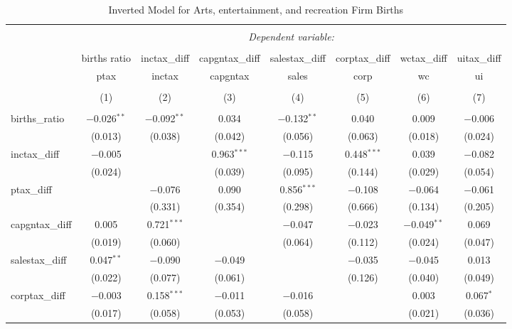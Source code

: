 
\begin{table}[!htbp] \centering 
  \caption{Inverted Model for  Arts, entertainment, and recreation Firm Births} 
  \label{71rd} 
\footnotesize 
\begin{tabular}{@{\extracolsep{5pt}}lccccccc} 
\\[-1.8ex]\hline 
\hline \\[-1.8ex] 
 & \multicolumn{7}{c}{\textit{Dependent variable:}} \\ 
\cline{2-8} 
\\[-1.8ex] & births ratio & inctax\_diff & capgntax\_diff & salestax\_diff & corptax\_diff & wctax\_diff & uitax\_diff \\ 
 & ptax & inctax & capgntax & sales & corp & wc & ui \\ 
\\[-1.8ex] & (1) & (2) & (3) & (4) & (5) & (6) & (7)\\ 
\hline \\[-1.8ex] 
 births\_ratio & $-$0.026$^{**}$ & $-$0.092$^{**}$ & 0.034 & $-$0.132$^{**}$ & 0.040 & 0.009 & $-$0.006 \\ 
  & (0.013) & (0.038) & (0.042) & (0.056) & (0.063) & (0.018) & (0.024) \\ 
  inctax\_diff & $-$0.005 &  & 0.963$^{***}$ & $-$0.115 & 0.448$^{***}$ & 0.039 & $-$0.082 \\ 
  & (0.024) &  & (0.039) & (0.095) & (0.144) & (0.029) & (0.054) \\ 
  ptax\_diff &  & $-$0.076 & 0.090 & 0.856$^{***}$ & $-$0.108 & $-$0.064 & $-$0.061 \\ 
  &  & (0.331) & (0.354) & (0.298) & (0.666) & (0.134) & (0.205) \\ 
  capgntax\_diff & 0.005 & 0.721$^{***}$ &  & $-$0.047 & $-$0.023 & $-$0.049$^{**}$ & 0.069 \\ 
  & (0.019) & (0.060) &  & (0.064) & (0.112) & (0.024) & (0.047) \\ 
  salestax\_diff & 0.047$^{**}$ & $-$0.090 & $-$0.049 &  & $-$0.035 & $-$0.045 & 0.013 \\ 
  & (0.022) & (0.077) & (0.061) &  & (0.126) & (0.040) & (0.049) \\ 
  corptax\_diff & $-$0.003 & 0.158$^{***}$ & $-$0.011 & $-$0.016 &  & 0.003 & 0.067$^{*}$ \\ 
  & (0.017) & (0.058) & (0.053) & (0.058) &  & (0.021) & (0.036) \\ 

\end{tabular}
\end{table}
